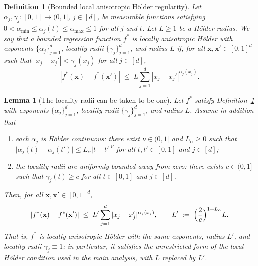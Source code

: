 \documentclass[10pt,a4paper]{amsart}
\newtheorem{definition}{Definition}
\newtheorem{lemma}{Lemma}
\newcommand{\bx}{\mathbf{x}}
\begin{document}
\begin{definition}[Bounded local anisotropic H\"older regularity]
\label{def:local-holder-general}
Let $\alpha_j,\gamma_j:[0,1]\to(0,1]$, $j\in[d]$, be measurable
functions satisfying $0<\alpha_{\min}\le\alpha_j(t)\le\alpha_{\max}\le1$
for all $j$ and $t$. Let $L\ge1$ be a H\"older radius. We say that a
bounded regression function $f^*$ is \emph{locally anisotropic
H\"older with exponents $\{\alpha_j\}_{j=1}^d$, locality radii
$\{\gamma_j\}_{j=1}^d$, and radius $L$} if, for all
$\bx,\bx'\in[0,1]^d$ such that $|x_j-x_j'|<\gamma_j(x_j)$ for all
$j\in[d]$,
\begin{equation}\label{eq:general-local-holder}
|f^*(\bx)-f^*(\bx')|
\;\le\;
L\sum_{j=1}^d |x_j-x_j'|^{\alpha_j(x_j)} .
\end{equation}
\end{definition}

\begin{lemma}[The locality radii can be taken to be one]
\label{lem:radius-one}
Let $f^*$ satisfy Definition~\ref{def:local-holder-general} with
exponents $\{\alpha_j\}_{j=1}^d$, locality radii
$\{\gamma_j\}_{j=1}^d$, and radius $L$. Assume in addition that
\begin{enumerate}
\item[(i)] each $\alpha_j$ is H\"older continuous: there exist
  $\nu\in(0,1]$ and $L_\alpha\ge0$ such that
  $\lvert\alpha_j(t)-\alpha_j(t')\rvert\le
  L_\alpha\lvert t-t'\rvert^{\nu}$
  for all $t,t'\in[0,1]$ and $j\in[d]$;
\item[(ii)] the locality radii are uniformly bounded away from zero:
  there exists $c\in(0,1]$ such that $\gamma_j(t)\ge c$ for all
  $t\in[0,1]$ and $j\in[d]$.
\end{enumerate}
Then, for \emph{all} $\bx,\bx'\in[0,1]^d$,
\[
|f^*(\bx)-f^*(\bx')|
\;\le\;
L'\sum_{j=1}^d |x_j-x_j'|^{\alpha_j(x_j)},
\qquad
L' \;:=\; \Bigl(\frac{2}{c}\Bigr)^{1+L_\alpha} L .
\]
That is, $f^*$ is locally anisotropic H\"older with the same
exponents, radius $L'$, and locality radii $\gamma_j\equiv 1$; in
particular, it satisfies the unrestricted form of the local H\"older
condition used in the main analysis, with $L$ replaced by $L'$.
\end{lemma}
\end{document}
